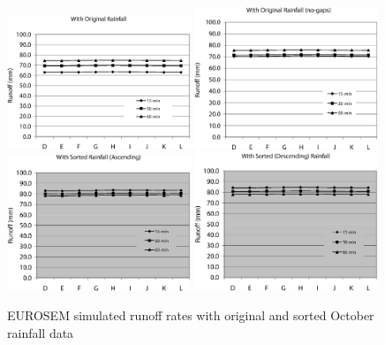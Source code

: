 \begin{figure}[htbp]
  \centering
    \includegraphics[width=0.49\textwidth]{./img/eurosem_runoff_with_original}
    \includegraphics[width=0.49\textwidth]
{./img/eurosem_runoff_with_original_nogap}\\[5mm]
    \includegraphics[width=0.49\textwidth]{./img/eurosem_runoff_with_sorted_asc}
    \includegraphics[width=0.49\textwidth]{./img/eurosem_runoff_with_sorted_des}
  \caption{EUROSEM simulated runoff rates with original and sorted October
rainfall data}
  \label{fig:eurosem_runoff_results}
\end{figure}

